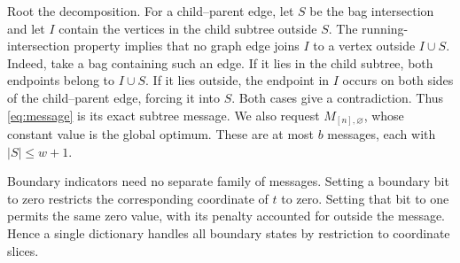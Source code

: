 Root the decomposition. For a child--parent edge, let $S$ be the bag
intersection and let $I$ contain the vertices in the child subtree outside
$S$. The running-intersection property implies that no graph edge joins
$I$ to a vertex outside $I\cup S$. Indeed, take a bag containing such an
edge. If it lies in the child subtree, both endpoints belong to $I\cup S$.
If it lies outside, the endpoint in $I$ occurs on both sides of the
child--parent edge, forcing it into $S$. Both cases give a contradiction.
Thus \eqref{eq:message} is its exact
subtree message. We also request $M_{[n],\varnothing}$, whose constant value
is the global optimum. These are at most $b$ messages, each with
$|S|\le w+1$.

Boundary indicators need no separate family of messages. Setting a boundary
bit to zero restricts the corresponding coordinate of $t$ to zero. Setting
that bit to one permits the same zero value, with its penalty accounted for
outside the message. Hence a single dictionary handles all boundary states
by restriction to coordinate slices.

